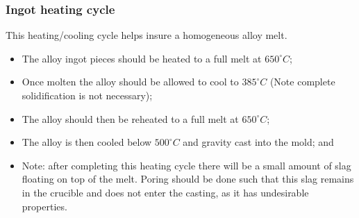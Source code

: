 \subsubsection{Ingot heating cycle}

This heating/cooling cycle helps insure a homogeneous alloy melt.
\begin{itemize}
\item The \MgZnCa alloy ingot pieces should be heated to a full melt at $650^{\circ}C$;
\item Once molten the alloy should be allowed to cool to $385^{\circ}C$ (Note complete solidification is not necessary);
\item The alloy should then be reheated to a full melt at $650^{\circ}C$;
\item The alloy is then cooled below $500^{\circ}C$ and gravity cast into the mold; and
\item Note: after completing this heating cycle there will be a small amount of slag floating on top of the melt. Poring should be done such that this slag remains in the crucible and does not enter the casting, as it has undesirable properties. 
\end{itemize}